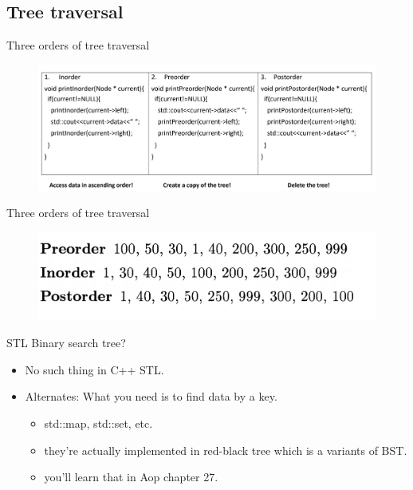 \documentclass[aspectratio=169]{beamer}
\begin{document}

\subsection{Tree traversal}
\begin{frame}{Three orders of tree traversal}
        \begin{figure}
            \includegraphics[width=\textwidth]{BST_traverse.png}
    \end{figure}
\end{frame}

\begin{frame}{Three orders of tree traversal}
        \begin{figure}
            \includegraphics[width=\textwidth]{BST_order.png}
    \end{figure}
\end{frame}

\begin{frame}{STL Binary search tree?}

\begin{itemize}
    \item No such thing in C++ STL.
    \item Alternates: What you need is to find  data by a key.
        \begin{itemize}
            \item std::map, std::set, etc.
            \item they're actually implemented in red-black tree which is a variants of BST.
            \item you'll learn that in Aop chapter 27.
        \end{itemize}
\end{itemize}
    
\end{frame}
\end{document}
